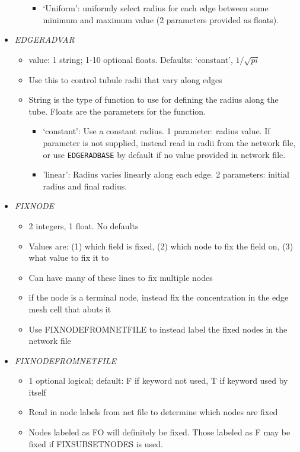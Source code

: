 \documentclass[12pt]{article}
\begin{document}
\begin{itemize}
\begin{itemize}
\begin{itemize}
		\item `Uniform': uniformly select radius for each edge between some minimum and maximum value (2 parameters provided as floats).
	\end{itemize}
\end{itemize}
%
\item {\it EDGERADVAR}
\begin{itemize}
	\item  value: 1 string; 1-10 optional floats. Defaults: `constant', $1/\sqrt{pi}$
	\item Use this to control tubule radii that vary along edges
	\item String is the type of function to use for defining the radius along the tube. Floats are the parameters for the function.
	\begin{itemize}
		\item `constant': Use a constant radius. 1 parameter: radius value. If parameter is not supplied, instead read in radii from the network file, or use \verb=EDGERADBASE= by default if no value provided in network file.
		\item 'linear': Radius varies linearly along each edge. 2 parameters: initial radius and final radius.
	\end{itemize}
\end{itemize}
%
\item {\it FIXNODE}
\begin{itemize}
	\item 2 integers, 1 float. No defaults
	\item Values are: (1) which field is fixed, (2) which node to fix the field on, (3) what value to fix it to
	\item Can have many of these lines to fix multiple nodes
	\item if the node is a terminal node, instead fix the concentration in the edge mesh cell that abuts it
	\item Use FIXNODEFROMNETFILE to instead label the fixed nodes in the network file
\end{itemize}
%
\item {\it FIXNODEFROMNETFILE}
\begin{itemize}
	\item 1 optional logical; default: F if keyword not used, T if keyword used by itself
	\item Read in node labels from net file to determine which nodes are fixed 
	\item Nodes labeled as FO will definitely be fixed. Those labeled as F may be fixed if FIXSUBSETNODES is used.

\end{itemize}
\end{itemize}
\end{document}
